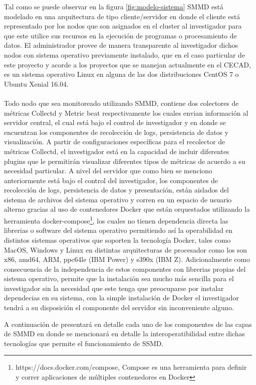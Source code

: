 Tal como se puede observar en la figura \ref{fig:modelo-sistema} SMMD está modelado en una arquitectura de tipo cliente/servidor en donde el cliente está representado por los nodos que son asignados en el cluster al investigador para que este utilice sus recursos en la ejecución de programas o procesamiento de datos. El administrador provee de manera transparente al investigador dichos nodos con sistema operativo previamente instalado, que en el caso particular de este proyecto y acorde a los proyectos que se manejan actualmente en el CECAD, es un sistema operativo Linux en alguna de las dos distribuciones CentOS 7 o Ubuntu Xenial 16.04.
\\\\
Todo nodo que sea monitoreado utilizando SMMD, contiene dos colectores de métricas Collectd y Metric beat respectivamente los cuales envian información al servidor central, el cual está bajo el control de investigador y en donde se encuentran los componentes de recolección de logs, persistencia de datos y visualización. A partir de configuraciones específicas para el recolector de métricas Collectd, el investigador está en la capacidad de incluir diferentes plugins que le permitirán visualizar diferentes tipos de métricas de acuerdo a su necesidad particular. A nivel del servidor que como bien se menciono anteriormente está bajo el control del investigador, los componentes de recolección de logs, persistencia de datos y presentación, están aislados del sistema de archivos del sistema operativo y corren en un espacio de usuario alterno gracias al uso de contenedores Docker que están orquestados utilizando la herramienta docker-compose\footnote{https://docs.docker.com/compose, Compose es una herramienta para definir y correr aplicaciones de múltiples contenedores en Docker}, los cuales no tienen dependencia directa las librerias o software del sistema operativo permitiendo así la operabilidad en distintos sistemas operativos que soporten la tecnología Docker, tales como MacOS, Windows y Linux en distintas arquitecturas de procesador como los son x86, amd64, ARM, ppc64le (IBM Power) y s390x (IBM Z). Adicionalmente como consecuencia de la independencia de estos componentes con librerias propias del sistema operativo, permite que la instalación sea mucho más sencilla para el investigador sin la necesidad que este tenga que preocuparse por instalar dependecias en su sistema, con la simple instalación de Docker el investigador tendrá a su disposición el componente del servidor sin inconveniente alguno.

A continuación de presentará en detalle cada uno de los componentes de las capas de SMMD en donde se mencionará en detalle la interoperatibilidad entre dichas tecnologías que permite el funcionamiento de SSMD.

